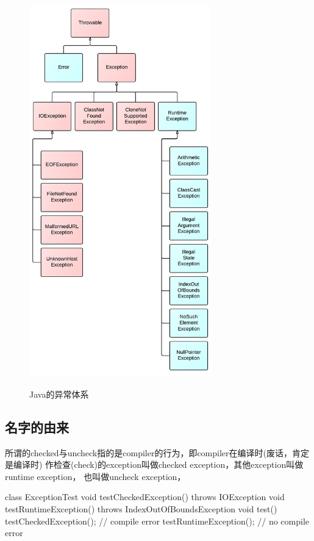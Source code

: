 \documentclass[a4paper,11pt]{article}
\begin{document}
\begin{figure}
  \centering
  \includegraphics[width=0.7\textwidth]{picturedir/JavaExceptions.jpeg}\\
  \caption{Java的异常体系}\label{fig:exceptions}
\end{figure}

\subsection[名字的由来]{名字的由来}
所谓的checked与uncheck指的是compiler的行为，即compiler在编译时(废话，肯定是编译时)
作检查(check)的exception叫做checked exception，其他exception叫做runtime exception，
也叫做uncheck exception，

\begin{javacode}
class ExceptionTest {
  void testCheckedException() throws IOException { }
  void testRuntimeException() throws IndexOutOfBoundsException { }
  void test() {
    testCheckedException(); // compile error
    testRuntimeException(); // no compile error
  }
}
\end{javacode}
\end{document}
